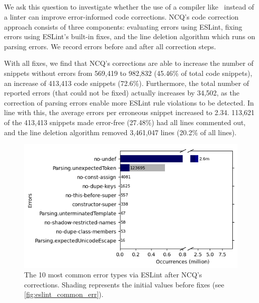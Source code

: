 \documentclass[conference]{IEEEtran}
\begin{document}
\vspace{0.5cm}
\vspace{1em}

\subsection{\rqfour}
\label{sec:rq4}

We ask this question to investigate whether the use of a compiler like \ts\ instead of a linter can improve error-informed code corrections. NCQ's code correction approach consists of three components: evaluating errors using ESLint, fixing errors using ESLint's built-in fixes, and the line deletion algorithm which runs on parsing errors. We record errors before and after all correction steps.

With all fixes, we find that NCQ's corrections are able to increase the number of snippets without errors from 569,419 to 982,832 (45.46\% of total code snippets), an increase of 413,413 code snippets (72.6\%). Furthermore, the total number of reported errors (that could not be fixed) actually increases by 34,502, as the correction of parsing errors enable more ESLint rule violations to be detected. In line with this, the average errors per erroneous snippet increased to 2.34. 113,621 of the 413,413 snippets made error-free (27.48\%) had all lines commented out, and the line deletion algorithm removed 3,461,047 lines (20.2\% of all lines).

\begin{figure}[h]
    \centering
    \includegraphics[width=0.8\linewidth]{images/eslint-commonErrorTypesDeletion.png}
    \caption{The 10 most common error types via ESLint after NCQ's corrections. Shading represents the initial values before fixes (see \autoref{fig:eslint_common_err}).}
    \label{fig:eslint_common_err_fixes}
\end{figure}
\end{document}
